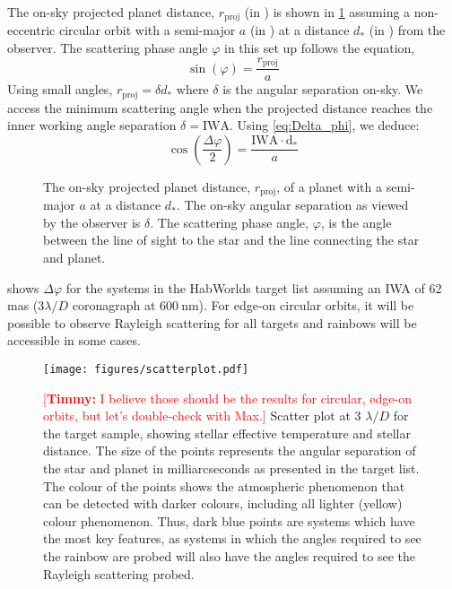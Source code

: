 \documentclass[
    usenatbib,
]{mnras}
\newcommand{\timmy}[1]{\textcolor{red}{[\textbf{Timmy:} #1]}} %
\begin{document}
The on-sky projected planet distance, $r_\mathrm{proj}$ (in \si{\au}) is shown in \cref{fig:scattering-angle} assuming a non-eccentric circular orbit with a semi-major $a$ (in \si{\au}) at a distance $d_*$ (in \si{\parsec}) from the observer. 
%
The scattering phase angle $\varphi$ in this set up follows the equation,
\begin{equation}
    \sin(\varphi) = \frac{r_\mathrm{proj}}{a}
\end{equation}
%
Using small angles, $r_\mathrm{proj} = \delta d_*$ where $\delta$ is the angular separation on-sky.
%
We access the minimum scattering angle when the projected distance reaches the inner working angle separation $\delta = \mathrm{IWA}$. 
%
Using \cref{eq:Delta_phi}, we deduce:
%
\begin{equation}
    \label{eq:scattering_angle}
    \cos\left(\dfrac{\Delta \varphi}{2}\right) = \frac{\mathrm{IWA \cdot d_*}}{a}
\end{equation}
\begin{figure}
    \centering
    
    \caption{
        The on-sky projected planet distance, $r_\mathrm{proj}$, of a planet with a semi-major $a$ at a distance $d_*$. The on-sky angular separation as viewed by the observer is $\delta$. The scattering phase angle, $\varphi$, is the angle between the line of sight to the star and the line connecting the star and planet.  
    }
    \label{fig:scattering-angle}
\end{figure}

 shows $\Delta \varphi$ for the systems in the HabWorlds target list assuming an IWA of 62 mas ($3 \lambda / D$ coronagraph at $\SI{600}{\nano\meter}$). 
%
%
For edge-on circular orbits, it will be possible to observe Rayleigh scattering for all targets and rainbows will be accessible in some cases.

\begin{figure*}
    \centering
    \texttt{[image: figures/scatterplot.pdf]}
    \caption{
        \timmy{I believe those should be the results for circular, edge-on orbits, but let's double-check with Max.}
        Scatter plot at 3 $\lambda/D$ for the target sample, showing stellar effective temperature and stellar distance. 
        The size of the points represents the angular separation of the star and planet in milliarcseconds as presented in the target list. 
        The colour of the points shows the atmospheric phenomenon that can be detected with darker colours, including all lighter (yellow) colour phenomenon. 
        Thus, dark blue points are systems which have the most key features, as systems in which the angles required to see the rainbow are probed will also have the angles required to see the Rayleigh scattering probed.
    }
    \label{fig:scatterplot}
\end{figure*}
\end{document}
